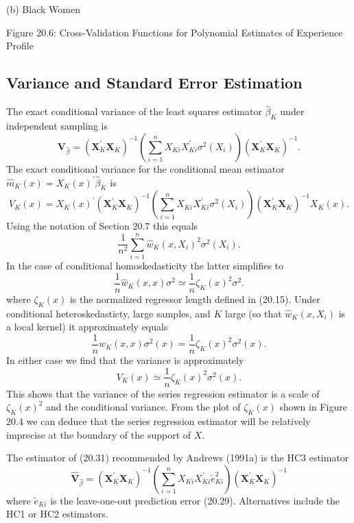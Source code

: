 \documentclass[10pt]{article}
\begin{document}
(b) Black Women

Figure 20.6: Cross-Validation Functions for Polynomial Estimates of Experience Profile

\subsection{Variance and Standard Error Estimation}
The exact conditional variance of the least squares estimator $\widehat{\beta}_{K}$ under independent sampling is
$$
\boldsymbol{V}_{\widehat{\beta}}=\left(\boldsymbol{X}_{K}^{\prime} \boldsymbol{X}_{K}\right)^{-1}\left(\sum_{i=1}^{n} X_{K i} X_{K i}^{\prime} \sigma^{2}\left(X_{i}\right)\right)\left(\boldsymbol{X}_{K}^{\prime} \boldsymbol{X}_{K}\right)^{-1} .
$$
The exact conditional variance for the conditional mean estimator $\widehat{m}_{K}(x)=X_{K}(x)^{\prime} \widehat{\beta}_{K}$ is
$$
V_{K}(x)=X_{K}(x)^{\prime}\left(\boldsymbol{X}_{K}^{\prime} \boldsymbol{X}_{K}\right)^{-1}\left(\sum_{i=1}^{n} X_{K i} X_{K i}^{\prime} \sigma^{2}\left(X_{i}\right)\right)\left(\boldsymbol{X}_{K}^{\prime} \boldsymbol{X}_{K}\right)^{-1} X_{K}(x) .
$$
Using the notation of Section $20.7$ this equals
$$
\frac{1}{n^{2}} \sum_{i=1}^{n} \widehat{w}_{K}\left(x, X_{i}\right)^{2} \sigma^{2}\left(X_{i}\right) .
$$
In the case of conditional homoskedasticity the latter simplifies to
$$
\frac{1}{n} \widehat{w}_{K}(x, x) \sigma^{2} \simeq \frac{1}{n} \zeta_{K}(x)^{2} \sigma^{2} .
$$
where $\zeta_{K}(x)$ is the normalized regressor length defined in (20.15). Under conditional heteroskedasticty, large samples, and $K$ large (so that $\widehat{w}_{K}\left(x, X_{i}\right)$ is a local kernel) it approximately equals
$$
\frac{1}{n} w_{K}(x, x) \sigma^{2}(x)=\frac{1}{n} \zeta_{K}(x)^{2} \sigma^{2}(x) .
$$
In either case we find that the variance is approximately
$$
V_{K}(x) \simeq \frac{1}{n} \zeta_{K}(x)^{2} \sigma^{2}(x) .
$$
This shows that the variance of the series regression estimator is a scale of $\zeta_{K}(x)^{2}$ and the conditional variance. From the plot of $\zeta_{K}(x)$ shown in Figure $20.4$ we can deduce that the series regression estimator will be relatively imprecise at the boundary of the support of $X$.

The estimator of (20.31) recommended by Andrews (1991a) is the HC3 estimator
$$
\widehat{\boldsymbol{V}}_{\widehat{\beta}}=\left(\boldsymbol{X}_{K}^{\prime} \boldsymbol{X}_{K}\right)^{-1}\left(\sum_{i=1}^{n} X_{K i} X_{K i}^{\prime} \widetilde{e}_{K i}^{2}\right)\left(\boldsymbol{X}_{K}^{\prime} \boldsymbol{X}_{K}\right)^{-1}
$$
where $\widetilde{e}_{K i}$ is the leave-one-out prediction error (20.29). Alternatives include the HC1 or HC2 estimators.
\end{document}
